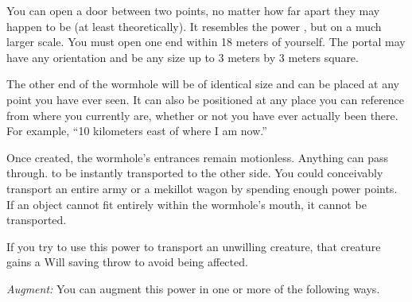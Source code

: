 {
	You can open a door between two points, no matter how far apart they may happen to be (at least theoretically). It resembles the power , but on a much larger scale. You must open one end within 18 meters of yourself. The portal may have any orientation and be any size up to 3 meters by 3 meters square.

	The other end of the wormhole will be of identical size and can be placed at any point you have ever seen. It can also be positioned at any place you can reference from where you currently are, whether or not you have ever actually been there. For example, ``10 kilometers east of where I am now.''

	Once created, the wormhole's entrances remain motionless. Anything can pass through. to be instantly transported to the other side. You could conceivably transport an entire army or a mekillot wagon by spending enough power points. If an object cannot fit entirely within the wormhole's mouth, it cannot be transported.

	If you try to use this power to transport an unwilling creature, that creature gains a Will saving throw to avoid being affected.

	\textit{Augment:} You can augment this power in one or more of the following ways.
}